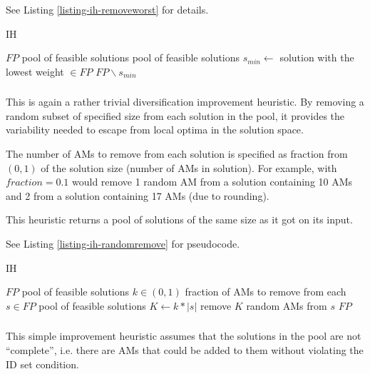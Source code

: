 See Listing \ref{listing-ih-removeworst} for details.

\begin{algorithm}
\caption{ IH}
\label{listing-ih-removeworst}
\begin{algorithmic}
\REQUIRE $FP$ pool of feasible solutions
\ENSURE pool of feasible solutions
\STATE $s_{min} \gets $ solution with the lowest weight $\in FP$
\RETURN $FP \backslash s_{min}$
\end{algorithmic}
\end{algorithm}

\subsubsection{}

This is again a rather trivial diversification improvement heuristic. By removing a random subset of specified size from each solution in the pool, it provides the variability needed to escape from local optima in the solution space.

The number of AMs to remove from each solution is specified as fraction from $(0, 1)$ of the solution size (number of AMs in solution). For example,  with $fraction = 0.1$ would remove 1 random AM from a solution containing 10 AMs and 2 from a solution containing 17 AMs (due to rounding).

This heuristic returns a pool of solutions of the same size as it got on its input.

See Listing \ref{listing-ih-randomremove} for pseudocode.

\begin{algorithm}
\caption{ IH}
\label{listing-ih-randomremove}
\begin{algorithmic}
\REQUIRE $FP$ pool of feasible solutions
\REQUIRE $k \in (0,1)$ fraction of AMs to remove from each $s \in FP$
\ENSURE pool of feasible solutions
  \STATE $K \gets k * |s|$
  \STATE remove $K$ random AMs from $s$
\ENDFOR
\RETURN $FP$
\end{algorithmic}
\end{algorithm}

\subsubsection{}

This simple improvement heuristic assumes that the solutions in the pool are not ``complete'', i.e. there are AMs that could be added to them without violating the ID set condition.

